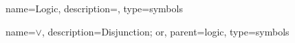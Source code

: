 %
{%
	name={Logic},
	description={},
	type=symbols
}

%
{%
	name={\ensuremath{\lor}},
	description={Disjunction; or},
	parent=logic,
	type=symbols
}
